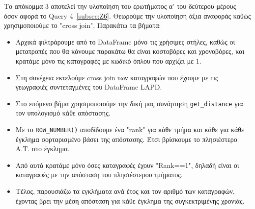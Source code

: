 \documentclass{article}
\begin{document}
Το απόκομμα 3 αποτελεί την υλοποίηση του ερωτήματος α' του δεύτερου μέρους όσον αφορά το Query 4~\ref{subsec:Z6}.  Θεωρούμε την υλοποίηση άξια αναφοράς καθώς χρησιμοποιούμε το  "cross join". Παρακάτω τα βήματα:
\begin{itemize}
    \item   Αρχικά φιλτράρουμε από το  DataFrame μόνο τις χρήσιμες στήλες, καθώς οι μετατροπές που θα κάνουμε παρακάτω θα είναι κοστοβόρες και χρονοβόρες, και κρατάμε μόνο τις καταγραφές με κωδικό όπλου που αρχίζει με $1$.
    \item   Στη συνέχεια εκτελούμε  cross join  των καταγραφών που έχουμε με τις γεωγραφιές συντεταγμένες του  DataFrame LAPD. 
    \item   {}Στο επόμενο βήμα χρησιμοποιούμε την δική μας συνάρτηση \texttt{get\_distance}  για τον υπολογισμό κάθε απόστασης.
    \item   Με το \texttt{ROW\_NUMBER()}  αποδίδουμε ένα "rank" για κάθε τμήμα και κάθε για κάθε έγκλημα σορταρισμένο βάσει της απόστασης. Έτσι βρίσκουμε το πλησιέστερο Α.Τ. στο έγκλημα. 
    \item   Από αυτά κρατάμε μόνο όσες καταγραφές έχουν "Rank==1", δηλαδή είναι οι καταγραφές με την απόσταση του πλησιέστερου τμήματος.
    \item   Τέλος, παρουσιάζω τα εγκλήματα ανά έτος και τον αριθμό των καταγραφών, έχοντας βρει την μέση απόσταση για κάθε έγκλημα της συγκεκτριμένης χρονιάς. 
\end{itemize}
\end{document}

